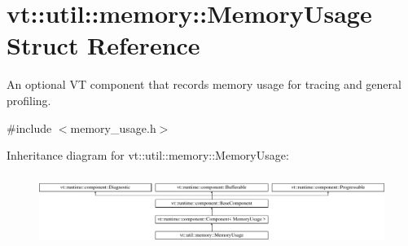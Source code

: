 \hypertarget{structvt_1_1util_1_1memory_1_1_memory_usage}{}\section{vt\+:\+:util\+:\+:memory\+:\+:Memory\+Usage Struct Reference}
\label{structvt_1_1util_1_1memory_1_1_memory_usage}


An optional VT component that records memory usage for tracing and general profiling.  




{\ttfamily \#include $<$memory\+\_\+usage.\+h$>$}

Inheritance diagram for vt\+:\+:util\+:\+:memory\+:\+:Memory\+Usage\+:\begin{figure}[H]
\begin{center}
\leavevmode
\includegraphics[height=2.348008cm]{structvt_1_1util_1_1memory_1_1_memory_usage}
\end{center}
\end{figure}
